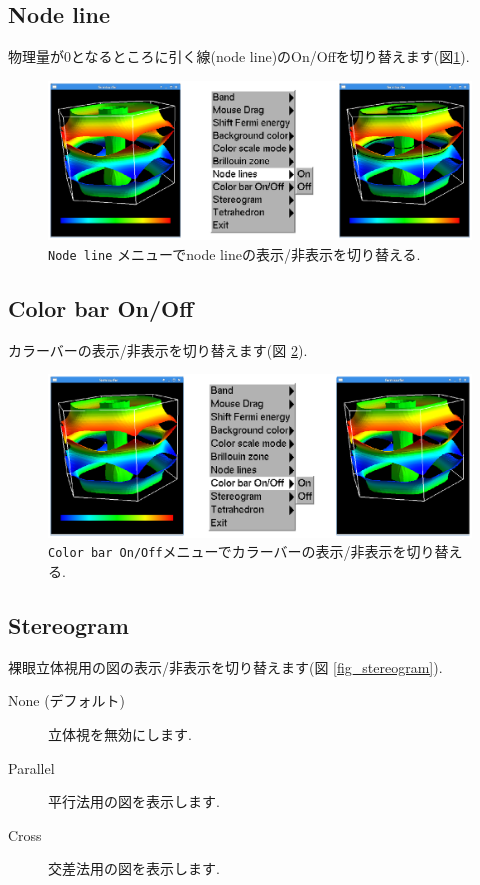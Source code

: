 \documentclass[12pt]{jarticle}
\begin{document}
\subsection{Node line}

物理量が0となるところに引く線(node line)のOn/Offを切り替えます(図\ref{fig_nodeline}).

\begin{figure}[!ht]
  \includegraphics[width=17cm]{figs/nodeline.eps}
  \caption{\texttt{Node line} メニューでnode lineの表示/非表示を切り替える.}
  \label{fig_nodeline}
\end{figure}

\subsection{Color bar On/Off}

カラーバーの表示/非表示を切り替えます(図 \ref{fig_colorbar}). 

\begin{figure}[!ht]
  \includegraphics[width=17cm]{figs/colorbar.eps}
  \caption{\texttt{Color bar On/Off}メニューでカラーバーの表示/非表示を切り替える.}
  \label{fig_colorbar}
\end{figure}

\subsection{Stereogram}

裸眼立体視用の図の表示/非表示を切り替えます(図 \ref{fig_stereogram}). 
\begin{description}
\item[None (デフォルト)] 立体視を無効にします. 
\item[Parallel] 平行法用の図を表示します. 
\item[Cross] 交差法用の図を表示します. 
\end{description}
\end{document}
